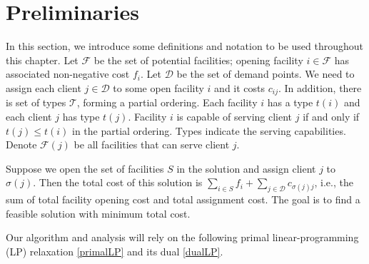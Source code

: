 \section{Preliminaries}

In this section, we introduce some definitions and notation to be used throughout this chapter.
%
Let $\mathcal{F}$ be the set of potential facilities; opening facility $i \in \mathcal{F}$ has associated non-negative cost $f_i$.
Let $\mathcal{D}$ be the set of demand points. We need to assign each client $j \in \mathcal{D}$ to some open facility $i$ and it costs $c_{ij}$.
%
In addition, there is set of types $\mathcal{T}$, forming a partial ordering. Each facility $i$ has a type $t(i)$ and each client $j$ has type $t(j)$. Facility $i$ is capable of serving client $j$ if and only if $t(j) \le t(i)$ in the partial ordering. Types indicate the serving capabilities. Denote $\mathcal{F}(j)$ be all facilities that can serve client $j$.

Suppose we open the set of facilities $S$ in the solution and assign client $j$ to $\sigma(j)$. Then the total cost of this solution is
$\sum_{i \in S} f_i + \sum_{j \in \mathcal{D}} c_{\sigma(j)j}$, i.e., 
the sum of total facility opening cost and total assignment cost. The goal is to find a feasible solution with minimum total cost.

Our algorithm and analysis will rely on the following primal linear-programming (LP)
relaxation \eqref{primalLP} and its dual \eqref{dualLP}. %

